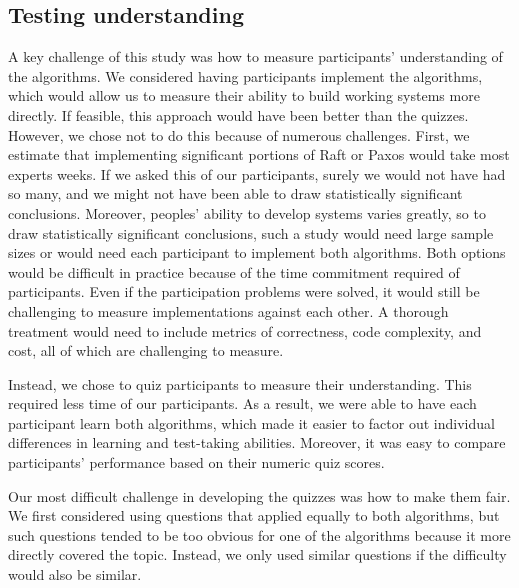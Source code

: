 \subsection{Testing understanding}
\label{userstudy:methodsdiscussion:testing}

A key challenge of this study was how to measure participants'
understanding of the algorithms.
%
We considered having participants implement the algorithms, which would
allow us to measure their ability to build working systems more
directly. If feasible, this approach would have been better than the
quizzes. However, we chose not to do
this because of numerous challenges. First, we estimate that implementing
significant portions of Raft or Paxos would take most experts weeks. If
we asked this of our participants, surely we would not have had so many,
and we might not have been able to draw statistically significant
conclusions. Moreover, peoples' ability to develop systems varies
greatly, so to draw statistically significant conclusions, such a study
would need large sample sizes or would need each participant to
implement both algorithms. Both options would be difficult in practice
because of the time commitment required of participants. Even if the
participation problems were solved, it would still be challenging to
measure implementations against each other. A thorough treatment would
need to include metrics of correctness, code complexity, and cost, all
of which are challenging to measure.

Instead, we chose to quiz participants to measure their understanding.
This required less time of our participants. As a result, we were able
to have each participant learn both algorithms, which
made it easier to factor out individual differences in learning and
test-taking abilities. Moreover, it was easy to compare
participants' performance based on their numeric quiz scores.

Our most difficult challenge in developing the quizzes was how to make
them fair. We first considered using questions that
applied equally to both algorithms, but such questions tended to be
too obvious for one of the algorithms because it more directly covered
the topic. Instead, we only used similar questions if the
difficulty would also be similar.


